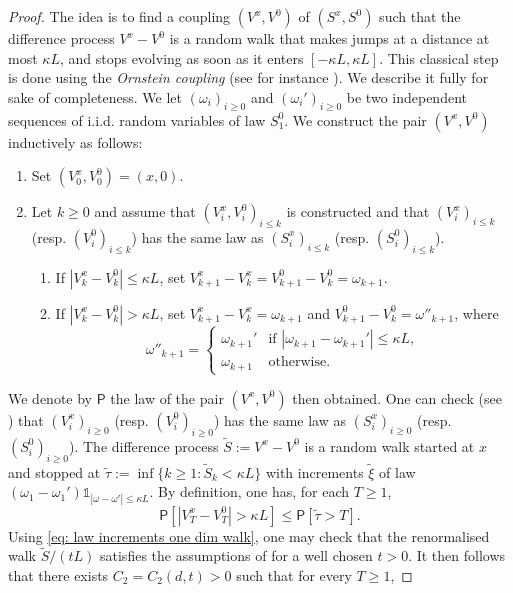 \documentclass[11pt,a4paper]{article}
\numberwithin{equation}{section}
\theoremstyle{plain}
\theoremstyle{definition}
\begin{document}
\begin{proof}
 The idea is to find a coupling $(V^x,V^0)$ of $(S^{x},S^{0})$ such that the difference process $V^{x}-V^{0}$ is a random walk that makes jumps at a distance at most $\kappa L$, and stops evolving as soon as it enters $[-\kappa L, \kappa L]$. This classical step is done using the \emph{Ornstein coupling} (see for instance \cite[(3.3)]{den2012probability}). We describe it fully for sake of completeness. We let $(\omega_i)_{i\geq 0}$ and $(\omega_i')_{i\geq 0}$ be two independent sequences of i.i.d. random variables of law $S_1^0$. We construct the pair $(V^x,V^0)$ inductively as follows:
 \begin{enumerate}
 	\item Set $(V^x_0,V^0_0)=(x,0)$.
 	\item Let $k\geq 0$ and assume that $(V^x_i,V^0_i)_{i\leq k}$ is constructed and that $(V^x_i)_{i\leq k}$ (resp. $(V^0_i)_{i\leq k}$) has the same law as $(S^x_i)_{i\leq k}$ (resp. $(S^0_i)_{i\leq k}$). 
 	\begin{enumerate}
 	\item If $|V^x_k-V^0_k|\leq \kappa L$, set $V^x_{k+1}-V^x_k=V^0_{k+1}-V^0_k=\omega_{k+1}$.
 	\item If $|V^x_k-V^0_k|>\kappa L$, set $V^x_{k+1}-V^x_k=\omega_{k+1}$ and $V^0_{k+1}-V^0_k=\omega''_{k+1}$, where
 	\begin{equation}
 		\omega''_{k+1}= \left\{
    \begin{array}{ll}
        \omega_{k+1}' & \mbox{if } |\omega_{k+1}-\omega_{k+1}'|\leq \kappa L, \\
        \omega_{k+1} & \mbox{otherwise.}
    \end{array}
\right.
 	\end{equation}
 	\end{enumerate}
 \end{enumerate}
  We denote by $\mathsf P$ the law of the pair $(V^x,V^0)$ then obtained. One can check (see \cite{den2012probability}) that $(V^x_i)_{i\geq 0}$ (resp. $(V^0_i)_{i\geq 0}$) has the same law as $(S^x_i)_{i\geq 0}$ (resp. $(S^0_i)_{i\geq 0}$). The difference process $\tilde S:=V^x-V^0$ is a random walk started at $x$ and stopped at $\tilde \tau:=\inf \{k\geq 1: \tilde S_k<\kappa L\}$ with increments $\tilde \xi$ of law $(\omega_1-\omega_1')\mathds{1}_{|\omega-\omega'|\leq \kappa L}$. By definition, one has, for each $T\geq 1$,
  \begin{equation}
  	\mathsf P[|V^x_T-V^0_T|>\kappa L]\leq \mathsf P[\tilde \tau >T].
  \end{equation}
  Using \eqref{eq: law increments one dim walk}, one may check that the renormalised walk $\tilde S/(tL)$ satisfies the assumptions of \cite[Theorem~5.1.7]{LawlerLimicRandomWalks2010} for a well chosen $t>0$. It then follows that there exists $C_2=C_2(d,t)>0$ such that for every $T\geq 1$,

\end{proof}
\end{document}
